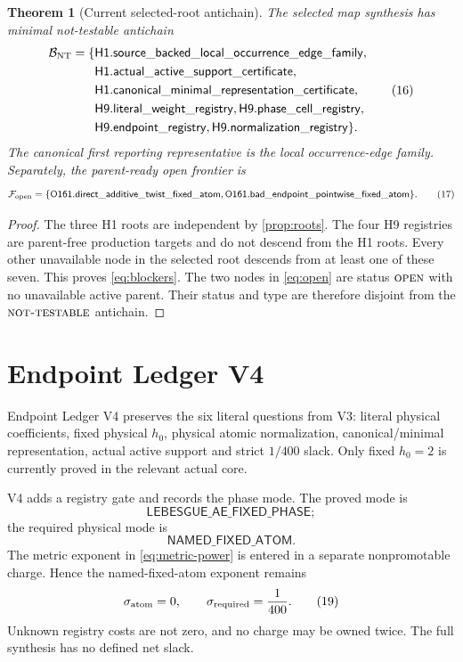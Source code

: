 \documentclass[11pt]{article}
\newtheorem{theorem}{Theorem}[section]
\theoremstyle{definition}
\theoremstyle{remark}
\newcommand{\NT}{\textnormal{\textsc{not-testable}}}
\newcommand{\OPEN}{\textnormal{\textsc{open}}}
\begin{document}
\begin{theorem}[Current selected-root antichain]
\label{thm:antichain}
The selected map synthesis has minimal not-testable antichain
\[
\begin{split}
\mathcal B_{\rm NT}=\{&
\mathsf{H1.source\_backed\_local\_occurrence\_edge\_family},\\
&\mathsf{H1.actual\_active\_support\_certificate},\\
&\mathsf{H1.canonical\_minimal\_representation\_certificate},\\
&\mathsf{H9.literal\_weight\_registry},
\mathsf{H9.phase\_cell\_registry},\\
&\mathsf{H9.endpoint\_registry},
\mathsf{H9.normalization\_registry}\}.
\end{split}
\tag{16}\label{eq:blockers}
\]
The canonical first reporting representative is the local
occurrence-edge family.  Separately, the parent-ready open frontier is
\[
\mathcal F_{\rm open}
=\{\mathsf{O161.direct\_additive\_twist\_fixed\_atom},
\mathsf{O161.bad\_endpoint\_pointwise\_fixed\_atom}\}.
\tag{17}\label{eq:open}
\]
\end{theorem}

\begin{proof}
The three H1 roots are independent by \cref{prop:roots}.  The four H9
registries are parent-free production targets and do not descend from
the H1 roots.  Every other unavailable node in the selected root
descends from at least one of these seven.  This proves
\eqref{eq:blockers}.  The two nodes in \eqref{eq:open} are status
\(\OPEN\) with no unavailable active parent.  Their status and type
are therefore disjoint from the \(\NT\) antichain.
\end{proof}

\section{Endpoint Ledger V4}

Endpoint Ledger V4 preserves the six literal questions from V3:
literal physical coefficients, fixed physical \(h_0\), physical
atomic normalization, canonical/minimal representation, actual
active support and strict \(1/400\) slack.  Only fixed \(h_0=2\) is
currently proved in the relevant actual core.

V4 adds a registry gate and records the phase mode.  The proved mode
is
\[
 \mathsf{LEBESGUE\_AE\_FIXED\_PHASE};
\]
the required physical mode is
\[
 \mathsf{NAMED\_FIXED\_ATOM}.
\tag{18}\label{eq:phase-gap}
\]
The metric exponent in \eqref{eq:metric-power} is entered in a
separate nonpromotable charge.  Hence the named-fixed-atom exponent
remains
\[
 \sigma_{\rm atom}=0,\qquad
 \sigma_{\rm required}=\frac1{400}.
\tag{19}\label{eq:ledger-power}
\]
Unknown registry costs are not zero, and no charge may be owned
twice.  The full synthesis has no defined net slack.
\end{document}
